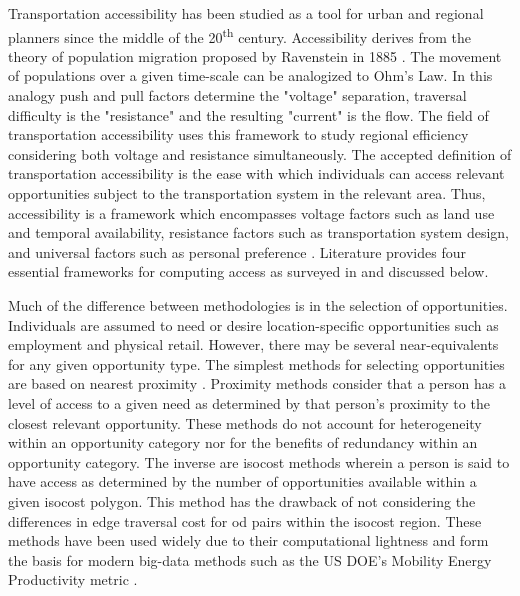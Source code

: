 \documentclass[11pt]{article}
\begin{document}
\begin{multicols}{2}
Transportation accessibility has been studied as a tool for urban and regional planners since the middle of the 20\textsuperscript{th} century. Accessibility derives from the theory of population migration proposed by Ravenstein in 1885 \cite{Ravenstein_1885}. The movement of populations over a given time-scale can be analogized to Ohm's Law. In this analogy push and pull factors determine the "voltage" separation, traversal difficulty is the "resistance" and the resulting "current" is the flow. The field of transportation accessibility uses this framework to study regional efficiency considering both voltage and resistance simultaneously. The accepted definition of transportation accessibility is the ease with which individuals can access relevant opportunities subject to the transportation system in the relevant area. Thus, accessibility is a framework which encompasses voltage factors such as land use and temporal availability, resistance factors such as transportation system design, and universal factors such as personal preference \cite{Geurs_2004}. Literature provides four essential frameworks for computing access as surveyed in \cite{Handy_1997, Kwan_1998, Geurs_2004, Miller_2018, Handy_2020} and discussed below.

Much of the difference between methodologies is in the selection of opportunities. Individuals are assumed to need or desire location-specific opportunities such as employment and physical retail. However, there may be several near-equivalents for any given opportunity type. The simplest methods for selecting opportunities are based on nearest proximity \cite{Wachs_1973, Vickerman_1974}. Proximity methods consider that a person has a level of access to a given need as determined by that person's proximity to the closest relevant opportunity. These methods do not account for heterogeneity within an opportunity category nor for the benefits of redundancy within an opportunity category. The inverse are isocost methods wherein a person is said to have access as determined by the number of opportunities available within a given isocost polygon. This method has the drawback of not considering the differences in edge traversal cost for \gls{od} pairs within the isocost region. These methods have been used widely \cite{Easa_1993} due to their computational lightness and form the basis for modern big-data methods such as the US DOE's Mobility Energy Productivity metric \cite{Hou_2019}.


\end{multicols}
\end{document}
